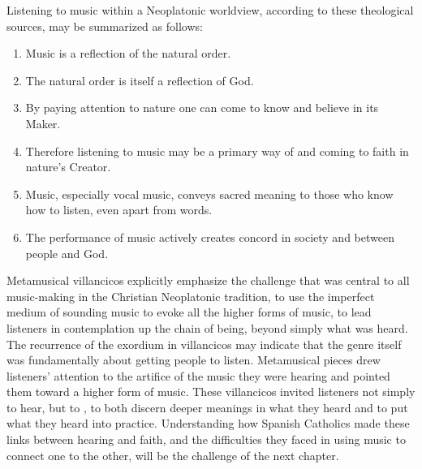 
Listening to music within a Neoplatonic worldview, according to these
theological sources, may be summarized as follows:
\begin{enumerate}
\item Music is a reflection of the natural order.
\item The natural order is itself a reflection of God.
\item By paying attention to nature one can come to know and believe in its
    Maker.
\item Therefore listening to music may be a primary way of  and coming to faith in nature's Creator.
\item Music, especially vocal music, conveys sacred meaning to those who know
    how to listen, even apart from words.
\item The performance of music actively creates concord in society and between
    people and God.  
\end{enumerate}

Metamusical villancicos explicitly emphasize the challenge that was central to
all music-making in the Christian Neoplatonic tradition, to use the imperfect
medium of sounding music to evoke all the higher forms of music, to lead
listeners in contemplation up the chain of being, beyond simply what was heard.
The recurrence of the  exordium in villancicos may indicate
that the genre itself was fundamentally about getting people to listen.
Metamusical pieces drew listeners' attention to the artifice of the music they
were hearing and pointed them toward a higher form of music.
These villancicos invited listeners not simply to hear, but to , to both discern deeper meanings in what they heard and to
put what they heard into practice.
Understanding how Spanish Catholics made these links between hearing and faith,
and the difficulties they faced in using music to connect one to the other,
will be the challenge of the next chapter.


\endinput

